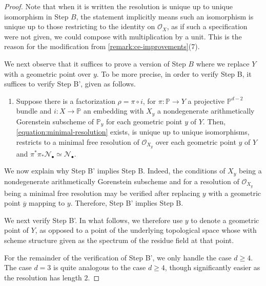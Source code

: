 \documentclass[12 pt]{amsart}
\theoremstyle{plain}
\theoremstyle{definition}
\theoremstyle{remark}
\numberwithin{equation}{section}
\newcommand\bp{\mathbb P}
\newcommand\scn{\mathscr N}
\newcommand\sco{\mathscr O}
\newcommand \ra{\rightarrow}
\begin{document}
\begin{proof}
	Note that when it is written the resolution is unique up to unique
	isomorphism in Step $B$, the statement implicitly means such an isomorphism is unique up to
	those restricting to the identity on $\mathscr O_X$, as if such a
	specification were not given, we could compose with multiplication by a
	unit. This is the reason for the modification from
	\autoref{remark:ce-improvements}(7).

	We next observe that it suffices to prove a version of Step $B$ where we
	replace $Y$ with a geometric point over $y$.
	To be more precise, in order to verify Step B, it suffices to verify
	Step B', given as follows.

	\begin{enumerate}
		\item[Step B':] Suppose there is a factorization $\rho =
	\pi \circ i$, for $\pi: \bp \ra Y$ a projective $\bp^{d-2}$ bundle and
	$i: X \ra \bp$ an embedding with $X_y$ a nondegenerate arithmetically Gorenstein
	subscheme of $\bp_y$ for each geometric point $y$ of $Y$.  Then,
	\eqref{equation:minimal-resolution} exists, is unique up to unique
	isomorphisms,  
	restricts to a minimal free resolution of $\sco_{X_y}$ over each
	geometric point $y$ of $Y$
and $\pi^* \pi_* \scn_\bullet \simeq \scn_\bullet$.
\end{enumerate}

	We now explain why Step B' implies Step B.
	Indeed, the conditions
	of $X_y$ being a nondegenerate arithmetically Gorenstein subscheme and
	for a resolution of $\mathscr O_{X_y}$ being a minimal free resolution
	may be verified after replacing $y$ with a geometric point $\overline
	{y}$ mapping to $y$.
	Therefore, Step B' implies Step B.

	We next verify Step B'.
	In what follows, we therefore use $y$ to denote a geometric point of
	$Y$, as opposed to a point of the underlying topological space whose
	with scheme structure given as the spectrum of the residue field at that
	point.

	For the remainder of the verification of Step B', we only handle the case $d \geq 4$. The case $d =
	3$ is quite analogous to the case $d \geq 4$, though significantly
	easier as the resolution has length $2$.
	

\end{proof}
\end{document}
